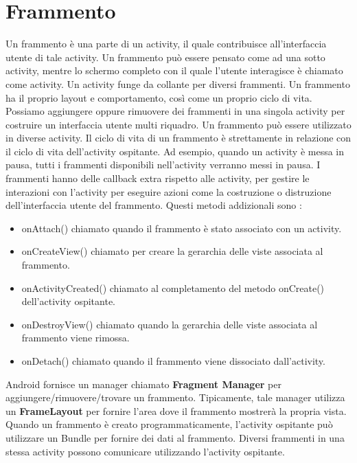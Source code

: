 \documentclass[12pt]{report}
\begin{document}
\section{Frammento}
Un frammento è una parte di un activity, il quale contribuisce all'interfaccia utente di tale activity. Un frammento può essere pensato come ad una sotto activity, mentre lo schermo completo con il quale l'utente interagisce è chiamato come activity. Un activity funge da collante per diversi frammenti. Un frammento ha il proprio layout e comportamento, così come un proprio ciclo di vita. Possiamo aggiungere oppure rimuovere dei frammenti in una singola activity per costruire un interfaccia utente multi riquadro. Un frammento può essere utilizzato in diverse activity. Il ciclo di vita di un frammento è strettamente in relazione con il ciclo di vita dell'activity ospitante. Ad esempio, quando un activity è messa in pausa, tutti i frammenti disponibili nell'activity verranno messi in pausa. I frammenti hanno delle callback extra rispetto alle activity, per gestire le interazioni con l'activity per eseguire azioni come la costruzione o distruzione dell'interfaccia utente del frammento. Questi metodi addizionali sono :
\begin{itemize}
\item onAttach() chiamato quando il frammento è stato associato con un activity.
\item onCreateView() chiamato per creare la gerarchia delle viste associata al frammento.
\item onActivityCreated() chiamato al completamento del metodo onCreate() dell'activity ospitante.
\item onDestroyView() chiamato quando la gerarchia delle viste associata al frammento viene rimossa.
\item onDetach() chiamato quando il frammento viene dissociato dall'activity.
\end{itemize} 
Android fornisce un manager chiamato \textbf{Fragment Manager} per aggiungere/rimuovere/trovare un frammento. Tipicamente, tale manager utilizza un \textbf{FrameLayout} per fornire l'area dove il frammento mostrerà la propria vista. Quando un frammento è creato programmaticamente, l'activity ospitante può utilizzare un Bundle per fornire dei dati al frammento. Diversi frammenti in una stessa activity possono comunicare utilizzando l'activity ospitante.
\end{document}
